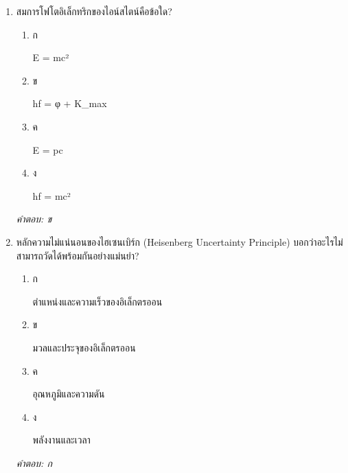 \documentclass[12pt]{article}
\begin{document}
\begin{enumerate}[label=\arabic*., itemsep=0.5\baselineskip, topsep=0.5\baselineskip, leftmargin=*]
\item สมการโฟโตอิเล็กทริกของไอน์สไตน์คือข้อใด?
\begin{enumerate}[label=\alph*)., itemsep=0.3\baselineskip, topsep=0.3\baselineskip]
\item ก\ 
\begin{minipage}[t]{0.9\linewidth}
\raggedright E = mc²
\end{minipage}
\item ข\ 
\begin{minipage}[t]{0.9\linewidth}
\raggedright hf = φ + K\_max
\end{minipage}
\item ค\ 
\begin{minipage}[t]{0.9\linewidth}
\raggedright E = pc
\end{minipage}
\item ง\ 
\begin{minipage}[t]{0.9\linewidth}
\raggedright hf = mc²
\end{minipage}
\end{enumerate}
\vspace{-0.3\baselineskip}
\begin{small}
\textit{คำตอบ: ข}
\end{small}

\item หลักความไม่แน่นอนของไฮเซนเบิร์ก (Heisenberg Uncertainty Principle) บอกว่าอะไรไม่สามารถวัดได้พร้อมกันอย่างแม่นยำ?
\begin{enumerate}[label=\alph*)., itemsep=0.3\baselineskip, topsep=0.3\baselineskip]
\item ก\ 
\begin{minipage}[t]{0.9\linewidth}
\raggedright ตำแหน่งและความเร็วของอิเล็กตรออน
\end{minipage}
\item ข\ 
\begin{minipage}[t]{0.9\linewidth}
\raggedright มวลและประจุของอิเล็กตรออน
\end{minipage}
\item ค\ 
\begin{minipage}[t]{0.9\linewidth}
\raggedright อุณหภูมิและความดัน
\end{minipage}
\item ง\ 
\begin{minipage}[t]{0.9\linewidth}
\raggedright พลังงานและเวลา
\end{minipage}
\end{enumerate}
\vspace{-0.3\baselineskip}
\begin{small}
\textit{คำตอบ: ก}
\end{small}


\end{enumerate}
\end{document}
